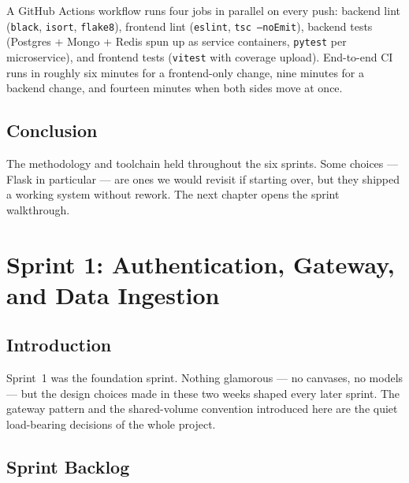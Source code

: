 \documentclass[12pt, a4paper, oneside]{report}
\begin{document}
A GitHub Actions workflow runs four jobs in parallel on every push:
backend lint (\texttt{black}, \texttt{isort}, \texttt{flake8}),
frontend lint (\texttt{eslint}, \texttt{tsc --noEmit}), backend
tests (Postgres + Mongo + Redis spun up as service containers,
\texttt{pytest} per microservice), and frontend tests
(\texttt{vitest} with coverage upload). End-to-end CI runs in
roughly six minutes for a frontend-only change, nine minutes for a
backend change, and fourteen minutes when both sides move at once.

\section*{Conclusion}

The methodology and toolchain held throughout the six sprints. Some
choices --- Flask in particular --- are ones we would revisit if
starting over, but they shipped a working system without rework. The
next chapter opens the sprint walkthrough.

\chapter{Sprint 1: Authentication, Gateway, and Data Ingestion}

\section*{Introduction}

Sprint~1 was the foundation sprint. Nothing glamorous --- no
canvases, no models --- but the design choices made in these two
weeks shaped every later sprint. The gateway pattern and the
shared-volume convention introduced here are the quiet load-bearing
decisions of the whole project.

\section{Sprint Backlog}
\end{document}
